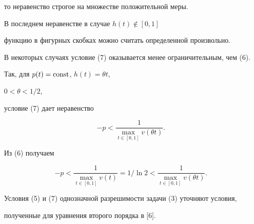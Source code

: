\begin{exam}
то неравенство строгое на множестве положительной меры.


В последнем неравенстве в случае $h(t)\notin[0,1]$


функцию в фигурных скобках можно считать определенной произвольно.





В некоторых случаях условие (7) оказывается менее ограничительным, чем (6).


Так, для $p(t)=\operatorname{const}$, $h(t)=\theta t$,


$0<\theta<1/2$,


условие (7) дает неравенство


$$


-p<\frac{1}{\max\limits_{t\in[0,1]}v(\theta t)}.


$$


Из (6) получаем


$$


-p<\frac{1}{\max\limits_{t\in[0,1]}v(t)}= 1/\ln 2 <


\frac{1}{\max\limits_{t\in[0,1]}v(\theta t)}.


$$





Условия (5) и (7) однозначной разрешимости задачи (3) уточняют условия,


полученные для уравнения второго порядка в [6].


\end{exam}





